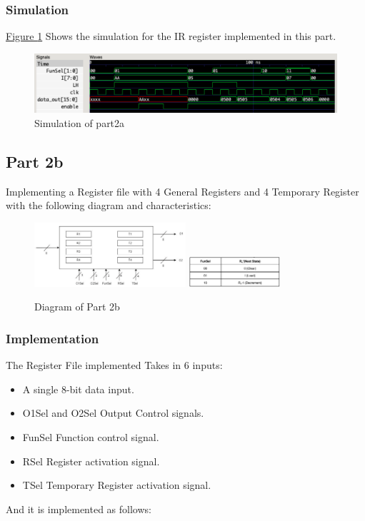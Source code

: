 \documentclass[pdftex,12pt,a4paper]{article}
\begin{document}
\subsubsection{Simulation}
\hyperref[fig:part2a_sim]{Figure \ref{fig:part2a_sim}} Shows the simulation for the IR register implemented in this part.

\begin{figure}[H]
\centering
\includegraphics[width=1\textwidth]{part2a_sim.png}
\caption{Simulation of part2a}
\label{fig:part2a_sim}
\end{figure}

\subsection{Part 2b}
Implementing a Register file with 4 General Registers and 4 Temporary Register with the following diagram and characteristics:
\begin{figure}[H]
\centering
\includegraphics[width=0.5\textwidth, valign=c]{part2b_diagram_2.png}
\hspace{1cm}
\includegraphics[width=0.3\textwidth, valign=c]{part2b_diagram_1.png}
\caption{Diagram of Part 2b}
\label{fig:part2b_diagram}
\end{figure}

\subsubsection{Implementation}
The Register File implemented Takes in 6 inputs:
\begin{itemize}
\item A single 8-bit data input.
\item O1Sel and O2Sel Output Control signals.
\item FunSel Function control signal.
\item RSel Register activation signal.
\item TSel Temporary Register activation signal.
\end{itemize}
And it is implemented as follows:
\end{document}
